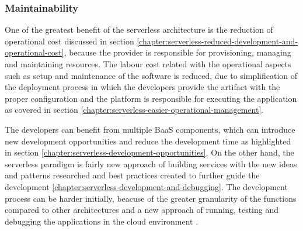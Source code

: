 

\subsubsection{Maintainability} \label{chapter:serverless-suitability-maintainability}

One of the greatest benefit of the serverless architecture is the reduction of operational cost discussed in section \ref{chapter:serverless-reduced-development-and-operational-cost}, because the provider is responsible for provisioning, managing and maintaining resources. The labour cost related with the operational aspects such as setup and maintenance of the software is reduced, due to simplification of the deployment process in which the developers provide the artifact with the proper configuration and the platform is responsible for executing the application as covered in section \ref{chapter:serverless-easier-operational-management}.

The developers can benefit from multiple BaaS components, which can introduce new development opportunities and reduce the development time as highlighted in section \ref{chapter:serverless-development-opportunities}. On the other hand, the serverless paradigm is fairly new approach of building services with the new ideas and patterns researched and best practices created to further guide the development \ref{chapter:serverless-development-and-debugging}.
The development process can be harder initially, beacuse of the greater granularity of the functions compared to other architectures and a new approach of running, testing and debugging the applications in the cloud environment \cite{EvaluationOfServerlessApplicationProgrammingModel}.

